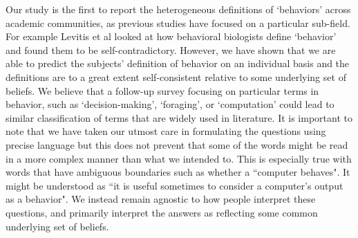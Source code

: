 \documentclass[a4paper, 11pt]{article}
\begin{document}
Our study is the first to report the heterogeneous definitions of `behaviors' across academic communities, as previous studies have focused on a particular sub-field. For example Levitis et al \cite{levitis2009behavioural} looked at how behavioral biologists define `behavior' and found them to be self-contradictory. However, we have shown that we are able to predict the subjects' definition of behavior on an individual basis and the definitions are to a great extent self-consistent relative to some underlying set of beliefs. We believe that a follow-up survey focusing on particular terms in behavior, such as `decision-making', `foraging', or `computation' could lead to similar classification of terms that are widely used in literature. It is important to note that we have taken our utmost care in formulating the questions using precise language but this does not prevent that some of the words might be  read in a more complex manner than what we intended to. This is especially true with words that have ambiguous boundaries such as whether a ``computer behaves". It might be understood as ``it is useful sometimes to consider a computer's output as a behavior". We instead remain agnostic to how people interpret these questions, and primarily interpret the answers as reflecting some common underlying set of beliefs.

\end{document}
